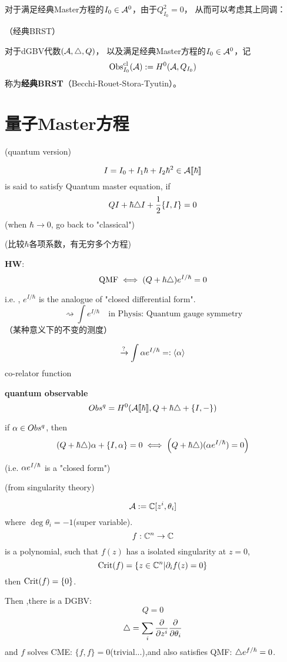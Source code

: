 
对于满足经典Master方程的$I_0\in\mathcal{A}^0$，由于$Q_{I_0}^2=0$，
从而可以考虑其上同调：

\begin{definition}（经典BRST）

对于dGBV代数$(\mathcal{A},\triangle,Q)$，
以及满足经典Master方程的$I_0\in\mathcal{A}^0$，记
$$\operatorname{Obs}^{\operatorname{cl}}_{I_0}(\mathcal{A}):=H^0(\mathcal{A},Q_{I_0})$$
称为\textbf{经典BRST}（Becchi-Rouet-Stora-Tyutin）。
\end{definition}

\section{量子Master方程}


(quantum version)

$$I=I_0+I_1\hbar+I_2\hbar^2\in\mathcal{A}[\![\hbar]\!]$$
is said to satisfy Quantum master equation, if
$$QI+\hbar\triangle I+\frac{1}{2}\{I,I\}=0$$
(when $\hbar\to 0$, go back to "classical")

(比较$\hbar$各项系数，有无穷多个方程)

\textbf{HW}:
$$\text{QMF}\iff (Q+\hbar\triangle)e^{I/\hbar}=0$$

i.e. , $e^{I/\hbar}$ is the analogue of "closed differential form".
$$\rightsquigarrow\int e^{I/\hbar}\quad
\text{in Physis: Quantum gauge symmetry}$$
（某种意义下的不变的测度）

$$\xrightarrow{?}\int \alpha e^{I/\hbar}=:\langle\alpha\rangle$$
co-relator function

\textbf{quantum observable}
$$Obs^q=H^0(\mathcal{A}[\![\hbar]\!],Q+\hbar\triangle+\{I,-\})$$

if $\alpha\in Obs^q$, then
$$(Q+\hbar\triangle)\alpha+\{I,\alpha\}=0
\iff\left
(Q+\hbar\triangle)(\alpha e^{I/\hbar})=0
\right)$$

(i.e. $\alpha e^{I/\hbar}$ is a "closed form")

\begin{example}(from singularity theory)

$$\mathcal{A}:=\mathbb{C}[z^i,\theta_i]$$
where $\deg\theta_i=-1$(super variable).
$$f:\mathbb{C}^n\to\mathbb{C}$$
is a polynomial, such that $f(z)$ has a isolated singularity  at $z=0$,
$$\operatorname{Crit}(f)=\{z\in\mathbb{C}^n|\partial_if(z)=0\}$$
then $\operatorname{Crit}(f)=\{0\}$.

Then ,there is a DGBV:
$$Q=0$$
$$\triangle=\sum_i\frac{\partial } {\partial z^i}\frac{\partial } {\partial \theta_i}$$
and $f$ solves CME: $\{f,f\}=0$(trivial...),and also satisfies QMF:
$\triangle e^{f/\hbar}=0$.
\end{example}

